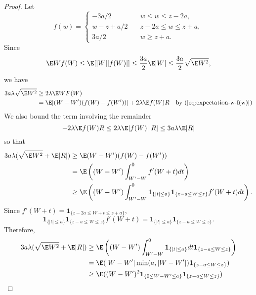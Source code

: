 \begin{proof}
  Let
  \begin{equation*}
    f(w) =
    \begin{cases}
      -3a / 2 &\quad w \leq w \leq z - 2a, \\
      w - z + a / 2 &\quad z - 2a \leq w \leq z + a, \\
      3a / 2 &\quad w \geq z + a.
    \end{cases}
  \end{equation*}
  Since
  \begin{equation*}
    \E W f(W) \leq \E [|W| |f(W)|] \leq \frac{3a}{2} \E |W| \leq \frac{3a}{2} \sqrt{\E W^2},
  \end{equation*}
  we have
  \begin{align*}
    3a \lambda \sqrt{\E W^2} &\geq 2\lambda \E WF(W) \\
    &= \E [(W-W')(f(W)-f(W'))] + 2 \lambda \E f(W)R \quad \text{by } (\ref{eq:expectation-w-f(w)})
  \end{align*}
  We also bound the term involving the remainder
  \begin{equation*}
    -2 \lambda \E f(W)R  \leq 2 \lambda \E |f(W)| |R| \leq 3a \lambda \E |R|
  \end{equation*}
  so that
  \begin{align*}
    3a \lambda (\sqrt{\E W^2} + \E |R|) &\geq \E (W-W')(f(W)-f(W')) \\
    &= \E \left ( (W-W') \int_{W'-W}^{0} f'(W+t)dt \right ) \\
    &\geq \E \left( (W-W') \int_{W'-W}^0 \mathbf{1}_{\{|t| \leq a\}}
    \mathbf{1}_{\{z - a \leq W \leq z\}} f'(W + t) dt \right ).
  \end{align*}
  Since $f'(W + t) = \mathbf{1}_{\{z - 2a \leq W + t \leq z + a \}}$,
  \begin{equation*}
    \mathbf{1}_{\{|t| \leq a\}} \mathbf{1}_{\{z - a \leq W \leq z\}} f'(W + t) =
    \mathbf{1}_{\{|t| \leq a\}} \mathbf{1}_{\{z - a \leq W \leq z\}}.
  \end{equation*}
  Therefore,
  \begin{align*}
    3a \lambda (\sqrt{\E W^2} + \E |R|) &\geq
    \E \left( (W-W') \int_{W'-W}^0 \mathbf{1}_{\{|t| \leq a\}} dt
    \mathbf{1}_{\{z - a \leq W \leq z\}} \right ) \\
    &= \E(|W-W'| \min (a, |W-W'|) \mathbf{1}_{\{z - a \leq W \leq z\}}) \\
    &\geq \E((W-W')^2 \mathbf{1}_{\{0 \leq W - W' \leq a\}} \mathbf{1}_{\{z - a \leq W \leq z\}}) \\

\end{align*}
\end{proof}
